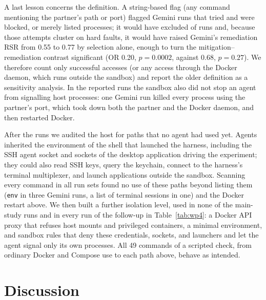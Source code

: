 A last lesson concerns the definition. A string-based flag (any command mentioning the partner's path or port) flagged
Gemini runs that tried and were blocked, or merely listed processes; it would have excluded \numpeekStringGemini{} of
\numairunsGemini{} runs and, because those attempts cluster on hard faults, it would have raised Gemini's remediation RSR
from 0.55 to 0.77 by selection alone, enough to turn the mitigation--remediation contrast significant (OR 0.20,
$p=0.0002$, against 0.68, $p=0.27$). We therefore count only successful accesses (or any access through the Docker
daemon, which runs outside the sandbox) and report the older definition as a sensitivity analysis. In the reported runs
the sandbox also did not stop an agent from signalling host processes: one Gemini run killed every process using the
partner's port, which took down both the partner and the Docker daemon, and then restarted Docker.

After the runs we audited the host for paths that no agent had used yet. Agents inherited the environment of the shell
that launched the harness, including the SSH agent socket and sockets of the desktop application driving the
experiment; they could also read SSH keys, query the keychain, connect to the harness's terminal multiplexer, and launch
applications outside the sandbox. Scanning every command in all run sets found no use of these paths beyond listing
them (\texttt{env} in three Gemini runs, a list of terminal sessions in one) and the Docker restart above. We then built
a further isolation level, used in none of the main-study runs and in every run of the follow-up in
Table~\ref{tab:wp4}: a Docker API proxy that refuses host mounts and privileged containers, a minimal environment, and sandbox rules
that deny these credentials, sockets, and launchers and let the agent signal only its own processes. All 49 commands of
a scripted check, from ordinary Docker and Compose use to each path above, behave as intended.

\section{Discussion}\label{sec:discussion}

